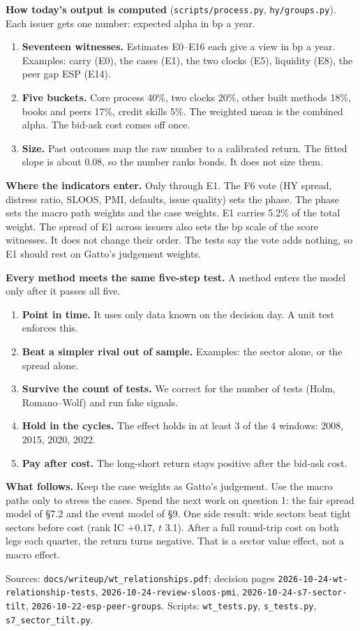 \documentclass[10pt,a4paper]{article}
\newcommand{\code}[1]{\texttt{\small #1}}
\begin{document}
\smallskip
\noindent\textbf{How today's output is computed} (\code{scripts/process.py}, \code{hy/groups.py}). Each issuer gets one number: expected alpha in bp a year.
\begin{enumerate}
\item \textbf{Seventeen witnesses.} Estimates E0--E16 each give a view in bp a year. Examples: carry (E0), the cases (E1), the two clocks (E5), liquidity (E8), the peer gap ESP (E14).
\item \textbf{Five buckets.} Core process 40\%, two clocks 20\%, other built methods 18\%, books and peers 17\%, credit skills 5\%. The weighted mean is the combined alpha. The bid-ask cost comes off once.
\item \textbf{Size.} Past outcomes map the raw number to a calibrated return. The fitted slope is about 0.08, so the number ranks bonds. It does not size them.
\end{enumerate}
\textbf{Where the indicators enter.} Only through E1. The F6 vote (HY spread, distress ratio, SLOOS, PMI, defaults, issue quality) sets the phase. The phase sets the macro path weights and the case weights. E1 carries 5.2\% of the total weight. The spread of E1 across issuers also sets the bp scale of the score witnesses. It does not change their order. The tests say the vote adds nothing, so E1 should rest on Gatto's judgement weights.

\smallskip
\noindent\textbf{Every method meets the same five-step test.} A method enters the model only after it passes all five.
\begin{enumerate}
\item \textbf{Point in time.} It uses only data known on the decision day. A unit test enforces this.
\item \textbf{Beat a simpler rival out of sample.} Examples: the sector alone, or the spread alone.
\item \textbf{Survive the count of tests.} We correct for the number of tests (Holm, Romano--Wolf) and run fake signals.
\item \textbf{Hold in the cycles.} The effect holds in at least 3 of the 4 windows: 2008, 2015, 2020, 2022.
\item \textbf{Pay after cost.} The long-short return stays positive after the bid-ask cost.
\end{enumerate}

\smallskip
\noindent\textbf{What follows.} Keep the case weights as Gatto's judgement. Use the macro paths only to stress the cases. Spend the next work on question 1: the fair spread model of \S7.2 and the event model of \S9. One side result: wide sectors beat tight sectors before cost (rank IC $+0.17$, $t$ 3.1). After a full round-trip cost on both legs each quarter, the return turns negative. That is a sector value effect, not a macro effect.

\vfill
{\scriptsize\raggedright Sources: \code{docs/writeup/wt\_relationships.pdf}; decision pages \code{2026-10-24-wt-relationship-tests}, \code{2026-10-24-review-sloos-pmi}, \code{2026-10-24-s7-sector-tilt}, \code{2026-10-22-esp-peer-groups}. Scripts: \code{wt\_tests.py}, \code{s\_tests.py}, \code{s7\_sector\_tilt.py}.}

\end{document}
